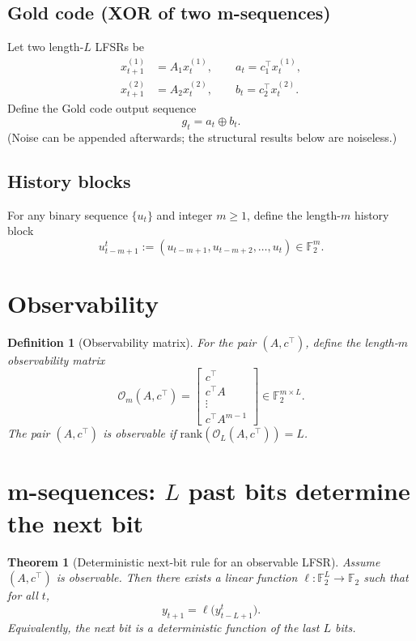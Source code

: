 \documentclass[12pt,a4paper]{report}
\newcommand{\F}{\mathbb{F}}
\newcommand{\rank}{\mathrm{rank}}
\theoremstyle{plain}
\newtheorem{thm}{Theorem}
\newtheorem{defn}{Definition}
\begin{document}
\subsection{Gold code (XOR of two m-sequences)}
Let two length-$L$ LFSRs be
\begin{align}
x^{(1)}_{t+1} &= A_1 x^{(1)}_t,\qquad a_t = c_1^\top x^{(1)}_t, \label{eq:lfsr1}\\
x^{(2)}_{t+1} &= A_2 x^{(2)}_t,\qquad b_t = c_2^\top x^{(2)}_t. \label{eq:lfsr2}
\end{align}
Define the Gold code output sequence
\begin{equation}
g_t = a_t \oplus b_t. \label{eq:gold}
\end{equation}
(Noise can be appended afterwards; the structural results below are noiseless.)

\subsection{History blocks}
For any binary sequence $\{u_t\}$ and integer $m\ge 1$, define the length-$m$ history block
\[
u_{t-m+1}^t := (u_{t-m+1},u_{t-m+2},\dots,u_t)\in \F_2^m.
\]

\section{Observability}

\begin{defn}[Observability matrix]
For the pair $(A,c^\top)$, define the length-$m$ observability matrix
\begin{equation}
\mathcal{O}_m(A,c^\top)
=
\begin{bmatrix}
c^\top\\
c^\top A\\
\vdots\\
c^\top A^{m-1}
\end{bmatrix}
\in \F_2^{m\times L}.
\end{equation}
The pair $(A,c^\top)$ is \emph{observable} if $\rank(\mathcal{O}_L(A,c^\top))=L$.
\end{defn}

\section{m-sequences: $L$ past bits determine the next bit}

\begin{thm}[Deterministic next-bit rule for an observable LFSR]
\label{thm:mseq_deterministic}
Assume $(A,c^\top)$ is observable. Then there exists a \emph{linear} function
$\ell:\F_2^L\to \F_2$ such that for all $t$,
\begin{equation}
y_{t+1} = \ell\big(y_{t-L+1}^t\big).
\end{equation}
Equivalently, the next bit is a deterministic function of the last $L$ bits.
\end{thm}
\end{document}
